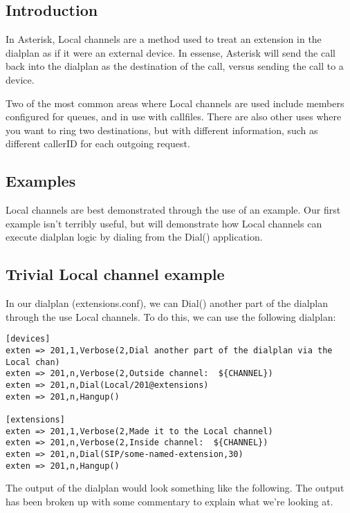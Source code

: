 \subsection{Introduction}

In Asterisk, Local channels are a method used to treat an extension in the 
dialplan as if it were an external device. In essense, Asterisk will send the
call back into the dialplan as the destination of the call, versus sending the
call to a device.  

Two of the most common areas where Local channels are used include members 
configured for queues, and in use with callfiles. There are also other uses
where you want to ring two destinations, but with different information, such as
different callerID for each outgoing request.

\subsection{Examples}

Local channels are best demonstrated through the use of an example. Our first
example isn't terribly useful, but will demonstrate how Local channels can 
execute dialplan logic by dialing from the Dial() application.


\subsection{Trivial Local channel example}

In our dialplan (extensions.conf), we can Dial() another part of the dialplan
through the use Local channels. To do this, we can use the following dialplan:

\begin{astlisting}
\begin{verbatim}
[devices]
exten => 201,1,Verbose(2,Dial another part of the dialplan via the Local chan)
exten => 201,n,Verbose(2,Outside channel:  ${CHANNEL})
exten => 201,n,Dial(Local/201@extensions)
exten => 201,n,Hangup()

[extensions]
exten => 201,1,Verbose(2,Made it to the Local channel)
exten => 201,n,Verbose(2,Inside channel:  ${CHANNEL})
exten => 201,n,Dial(SIP/some-named-extension,30)
exten => 201,n,Hangup()
\end{verbatim}
\end{astlisting}

The output of the dialplan would look something like the following. The output
has been broken up with some commentary to explain what we're looking at.

